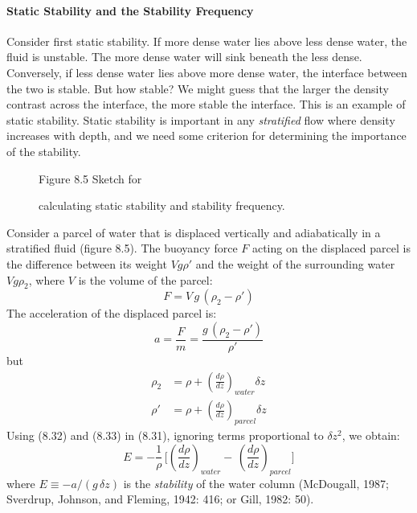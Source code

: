 \paragraph{Static Stability and the Stability Frequency} Consider first static
stability. If more dense water lies above less dense water, the fluid
is unstable. The more dense water will sink beneath the less
dense. Conversely, if less dense water lies above more dense water,
the interface between the two is stable.  But how stable? We might
guess that the larger the density contrast across the interface, the
more stable the interface. This is an example of static stability.
Static stability is important in any \textit{stratified} flow where
density increases with depth, and we need some criterion for
determining the importance of the stability.

\begin{figure}[b!]
\vspace{1ex}
\centering
\footnotesize
Figure 8.5 Sketch for \rule{0mm}{4ex}calculating static stability and
stability frequency.

\label{fig:stabilitysketch}
\end{figure}

Consider a parcel of water that is displaced vertically and
adiabatically in a stratified fluid (figure 8.5). The
buoyancy force $F$ acting on the displaced parcel is
the difference between its weight $V g \rho '$ and the weight of the
surrounding water $V g \rho_2$, where $V$ is the volume of the parcel:
\begin{displaymath}
F=V\,g\,(\rho_2-\rho{'})
\end{displaymath}
The acceleration of the displaced parcel is:
\begin{equation}
a=\frac{F}{m}=\frac{g\,(\rho_2-\rho{'})}{\rho{'}}
\end{equation}
but
\begin{align}
\rho_2  &= \rho + \left( \frac{d {\rho}}{d {z}}\right)_{water}
\delta z \\
\rho{'} &= \rho + \left( \frac{d {\rho}}{d {z}}\right)_{parcel}
\delta z
\end{align}
Using (8.32) and (8.33) in (8.31), ignoring terms proportional to
$\delta{z^2}$, we obtain:
\begin{equation}
E = -\frac{1}{\rho}\,\Biggl[\left(\frac{d \rho}{d {z}}\right)_{water}
- \,\left(\frac{d \rho}{d {z}}\right)_{parcel}\Biggr]
\end{equation}
where $E \equiv -a/(g \, \delta z)$ is the
\textit{stability} of the water column
(McDougall, 1987; Sverdrup, Johnson, and Fleming, 1942: 416; or Gill,
1982: 50).

